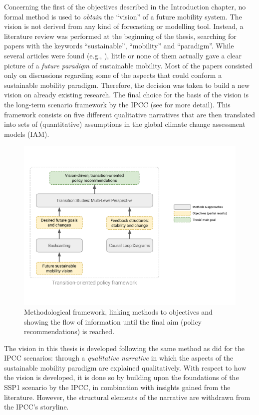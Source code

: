 Concerning the first of the objectives described in the Introduction chapter, no formal method is used to \emph{obtain} the ``vision'' of a future mobility system. The vision is not derived from any kind of forecasting or modelling tool. Instead, a literature review was performed at the beginning of the thesis, searching for papers with the keywords ``sustainable'', ``mobility'' and ``paradigm''. While several articles were found (e.g., \textcite{banister2008_sustainablemobilityparadigm}), little or none of them actually gave a clear picture of a \emph{future paradigm} of sustainable mobility. Most of the papers consisted only on discussions regarding some of the aspects that could conform a sustainable mobility paradigm. Therefore, the decision was taken to build a new vision on already existing research. The final choice for the basis of the vision is the long-term scenario framework by the \gls{IPCC} (see  for more detail). This framework consists on five different qualitative narratives that are then translated into sets of (quantitative) assumptions in the global climate change assessment models (\gls{IAM}).

\begin{figure}
\centering
\includegraphics[width=0.8\linewidth,trim=0 2cm 0 2cm,clip]{figures/methods-goals.pdf}
\caption[Methodological framework]{Methodological framework, linking methods to objectives and showing the flow of information until the final aim (policy recommendations) is reached.}
\label{f:thesis-aim-methods}
\end{figure}

The vision in this thesis is developed following the same method as \textcite{oneill2017_roadsaheadNarratives} did for the IPCC scenarios: through a \emph{qualitative narrative} in which the aspects of the sustainable mobility paradigm are explained qualitatively. With respect to how the vision is developed, it is done so by building upon the foundations of the SSP1 scenario by the IPCC, in combination with insights gained from the literature. However, the structural elements of the narrative are withdrawn from the IPCC's storyline.

